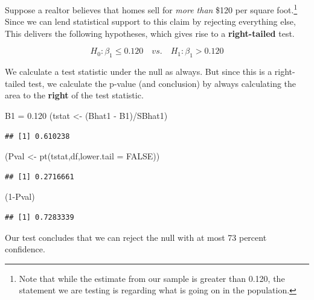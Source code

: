 \documentclass[
]{book}
\newenvironment{Shaded}{\begin{snugshade}}{\end{snugshade}}
\newcommand{\AttributeTok}[1]{\textcolor[rgb]{0.77,0.63,0.00}{#1}}
\newcommand{\ConstantTok}[1]{\textcolor[rgb]{0.00,0.00,0.00}{#1}}
\newcommand{\DecValTok}[1]{\textcolor[rgb]{0.00,0.00,0.81}{#1}}
\newcommand{\FloatTok}[1]{\textcolor[rgb]{0.00,0.00,0.81}{#1}}
\newcommand{\FunctionTok}[1]{\textcolor[rgb]{0.00,0.00,0.00}{#1}}
\newcommand{\NormalTok}[1]{#1}
\newcommand{\OtherTok}[1]{\textcolor[rgb]{0.56,0.35,0.01}{#1}}
\newcommand{\SpecialCharTok}[1]{\textcolor[rgb]{0.00,0.00,0.00}{#1}}
\begin{document}
Suppose a realtor believes that homes sell for \emph{more than} \$120 per square foot.\footnote{Note that while the estimate from our sample is greater than 0.120, the statement we are testing is regarding what is going on in the population.} Since we can lend statistical support to this claim by rejecting everything else, This delivers the following hypotheses, which gives rise to a \textbf{right-tailed} test.

\[H_0:\beta_1\leq0.120 \quad vs. \quad H_1:\beta_1>0.120\]

We calculate a test statistic under the null as always. But since this is a right-tailed test, we calculate the p-value (and conclusion) by always calculating the area to the \textbf{right} of the test statistic.

\begin{Shaded}
\begin{Highlighting}[]
\NormalTok{B1 }\OtherTok{=} \FloatTok{0.120}
\NormalTok{(tstat }\OtherTok{\textless{}{-}}\NormalTok{ (Bhat1 }\SpecialCharTok{{-}}\NormalTok{ B1)}\SpecialCharTok{/}\NormalTok{SBhat1)}
\end{Highlighting}
\end{Shaded}

\begin{verbatim}
## [1] 0.610238
\end{verbatim}

\begin{Shaded}
\begin{Highlighting}[]
\NormalTok{(Pval }\OtherTok{\textless{}{-}} \FunctionTok{pt}\NormalTok{(tstat,df,}\AttributeTok{lower.tail =} \ConstantTok{FALSE}\NormalTok{))}
\end{Highlighting}
\end{Shaded}

\begin{verbatim}
## [1] 0.2716661
\end{verbatim}

\begin{Shaded}
\begin{Highlighting}[]
\NormalTok{(}\DecValTok{1}\SpecialCharTok{{-}}\NormalTok{Pval)}
\end{Highlighting}
\end{Shaded}

\begin{verbatim}
## [1] 0.7283339
\end{verbatim}

Our test concludes that we can reject the null with at most 73 percent confidence.
\end{document}
